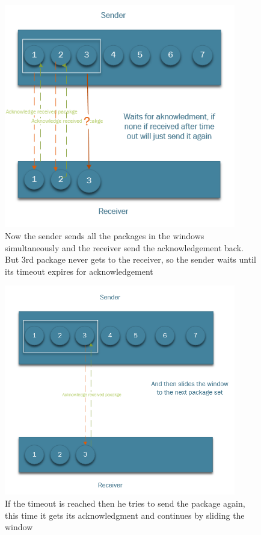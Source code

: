 \documentclass{WeSTassignment}
\begin{document}
\begin{figure}[h]
  	\centering
  	\includegraphics[width=0.9\textwidth]{swp2.png}
   	\caption{Now the sender sends all the packages in the windows simultaneously and the receiver send the acknowledgement back.
   	But 3rd package never gets to the receiver, so the sender waits until its timeout expires for acknowledgement}
     \label{fig:server}
\end{figure}


\begin{figure}[h]
  	\centering
  	\includegraphics[width=0.9\textwidth]{swp3.png}
   	\caption{If the timeout is reached then he tries to send the package again, this time it gets its acknowledgment and continues by sliding the window}
     \label{fig:server}
\end{figure}
\end{document}
